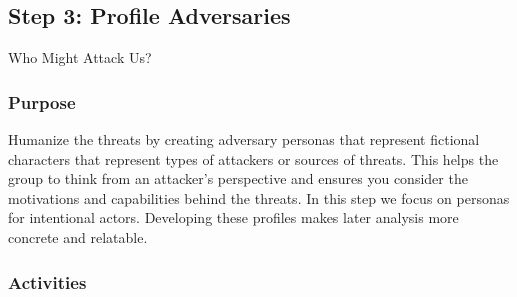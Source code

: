\subsection{Step 3: Profile Adversaries}
\label{subsec:Step3}

Who Might Attack Us?

\subsubsection{Purpose}

Humanize the threats by creating adversary personas that represent fictional
characters that represent types of attackers or sources of threats. This helps the
group to think from an attacker's perspective and ensures you consider the
motivations and capabilities behind the threats. In this step we focus on personas for
intentional actors. Developing these profiles makes later analysis more
concrete and relatable.

\subsubsection{Activities}

